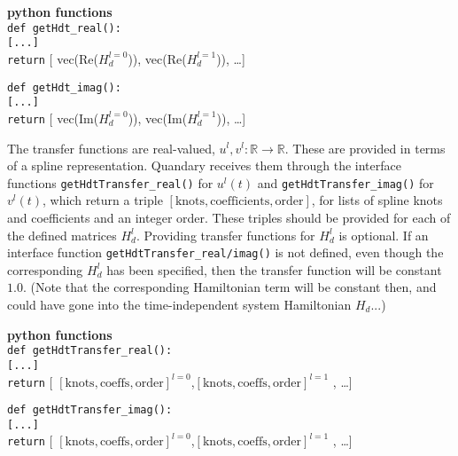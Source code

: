 \documentclass[11pt]{article}
\newcommand{\R}{\mathds{R}}
\begin{document}
\begin{itemize}
  \textbf{python functions}\\
  \texttt{def getHdt\_real():}\\
  \indent\hspace{1cm}\texttt{[...]}  \\
  \indent\hspace{1cm}\texttt{return} [ vec(Re($H_d^{l=0}$)), vec(Re($H_d^{l=1}$)), \dots ]

  \noindent \texttt{def getHdt\_imag():}\\
  \indent\hspace{1cm}\texttt{[...]}  \\
  \indent\hspace{1cm}\texttt{return} [ vec(Im($H_d^{l=0}$)), vec(Im($H_d^{l=1}$)), \dots ]


  
  The transfer functions are real-valued, $u^l,v^l\colon\R \to \R$. These are provided in terms of a spline representation. Quandary receives them through the interface functions \texttt{getHdtTransfer\_real()} for $u^l(t)$ and \texttt{getHdtTransfer\_imag()} for $v^l(t)$, which return a triple $\left[ \text{knots}, \text{coefficients}, \text{order} \right]$, for lists of spline knots and coefficients and an integer order.  These triples should be provided for each of the defined matrices $H_d^l$. Providing transfer functions for $H_d^l$ is optional. If an interface function \texttt{getHdtTransfer\_real/imag()} is not defined, even though the corresponding $H_d^l$ has been specified, then the transfer function will be constant $1.0$. (Note that the corresponding Hamiltonian term will be constant then, and could have gone into the time-independent system Hamiltonian $H_d$...) 

  \textbf{python functions}\\
  \texttt{def getHdtTransfer\_real():}\\
  \indent\hspace{1cm}\texttt{[...]}  \\
  \indent\hspace{1cm}\texttt{return} [ $\left[\text{knots}, \text{coeffs}, \text{order}\right]^{l=0}$,$\left[\text{knots}, \text{coeffs}, \text{order}\right]^{l=1}$ , \dots ]

  \noindent \texttt{def getHdtTransfer\_imag():}\\
  \indent\hspace{1cm}\texttt{[...]}  \\
  \indent\hspace{1cm}\texttt{return} [ $\left[\text{knots}, \text{coeffs}, \text{order}\right]^{l=0}$,$\left[\text{knots}, \text{coeffs}, \text{order}\right]^{l=1}$ , \dots ]




\end{itemize}
\end{document}
